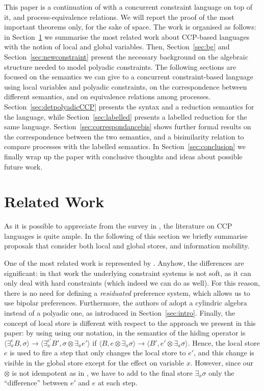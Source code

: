 \documentclass{llncs}
\begin{document}
This paper is a continuation of \cite{festcatuscia} with a concurrent constraint language on top of it, and process-equivalence relations.  We will report the proof of the most important theorems only, for the sake of space. The work is organised as  follows: in Section~\ref{sec:related} we summarise the most related work about CCP-based languages with the notion of local and global variables. Then, Section~\ref{sec:bg}  
and Section~\ref{sec:newconstraint} present the necessary background on the algebraic structure needed to model polyadic constraints. 
The following sections are focused on the semantics we can give to a concurrent constraint-based language using local variables and polyadic constraints, on the correspondence between different semantics, and on  equivalence relations among processes.
Section~\ref{sec:detpolyadicCCP} presents the syntax and a  reduction semantics for the language, while Section~\ref{sec:labelled} presents a labelled reduction for the same language.
Section~\ref{sec:correspondancebis} shows further formal results on the correspondence between the two semantics, and a bisimilarity relation to compare processes with the labelled semantics. In Section~\ref{sec:conclusion} we finally wrap up the paper with conclusive thoughts and ideas about possible future work.



\section{Related Work}\label{sec:related}
As it is possible to appreciate from the survey in \cite{emerging}, the literature on CCP languages is quite ample. In the following of this section  we briefly summarise proposals that consider both local and global stores, and information mobility.

One of the most related work is represented by \cite{pippo}. Anyhow, the differences are significant: in that work the underlying constraint systems is not soft, as it can only deal with hard constraints (which indeed we can do as well). For this reason, there is no need for defining a \emph{residuated} preference system, which allows us to use bipolar preferences. Furthermore, the authors of \cite{pippo} adopt a cylindric algebra instead of a polyadic one, as introduced in Section~\ref{sec:intro}. Finally, the concept of local store is different with respect to the approach we present in this paper: by using using our notation, in \cite{pippo} the semantics of the hiding operator  is $\langle 
\exists^{e}_x B, \sigma \rangle \to \langle  \exists^{e'}_x B', \sigma \otimes \exists_x e' \rangle$ if $\langle 
B, e \otimes \exists_x \sigma \rangle \to \langle  B', e' \otimes \exists_x \sigma \rangle$. Hence, the local store $e$ is used to fire a step that only changes the local store to $e'$, and this change is  visible in the global store except  for the effect on variable $x$. However, since our $\otimes$ is not idempotent as in \cite{pippo}, we have to add to the final store $ \exists_x \sigma$ only the ``difference'' between $e'$ and $e$ at each step.
\end{document}
